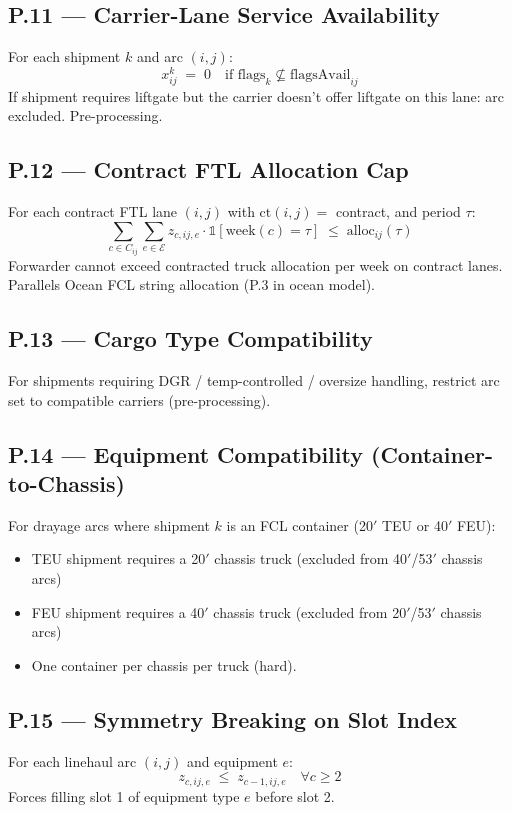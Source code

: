 \documentclass[11pt,a4paper]{article}
\theoremstyle{definition}
\begin{document}
\subsection*{P.11 — Carrier-Lane Service Availability}
For each shipment $k$ and arc $(i,j)$:
\begin{equation}
  x_{ij}^k \;=\; 0 \quad \text{if } \text{flags}_k \not\subseteq \text{flagsAvail}_{ij}
  \label{eq:tk-P11}
\end{equation}
If shipment requires liftgate but the carrier doesn't offer liftgate on this lane: arc
excluded. Pre-processing.

\subsection*{P.12 — Contract FTL Allocation Cap}
For each contract FTL lane $(i,j)$ with $\text{ct}(i,j) = $ contract, and period $\tau$:
\begin{equation}
  \sum_{c \in C_{ij}} \sum_{e \in \mathcal{E}} z_{c,ij,e} \cdot \mathbb{1}[\text{week}(c) = \tau]
  \;\leq\; \text{alloc}_{ij}(\tau)
  \label{eq:tk-P12}
\end{equation}
Forwarder cannot exceed contracted truck allocation per week on contract lanes.
Parallels Ocean FCL string allocation (P.3 in ocean model).

\subsection*{P.13 — Cargo Type Compatibility}
For shipments requiring DGR / temp-controlled / oversize handling, restrict arc set
to compatible carriers (pre-processing).

\subsection*{P.14 — Equipment Compatibility (Container-to-Chassis)}
For drayage arcs where shipment $k$ is an FCL container (20$'$ TEU or 40$'$ FEU):
\begin{itemize}[noitemsep]
  \item TEU shipment requires a 20$'$ chassis truck (excluded from 40$'$/53$'$ chassis arcs)
  \item FEU shipment requires a 40$'$ chassis truck (excluded from 20$'$/53$'$ chassis arcs)
  \item One container per chassis per truck (hard).
\end{itemize}

\subsection*{P.15 — Symmetry Breaking on Slot Index}
\label{sec:symmetry}
For each linehaul arc $(i,j)$ and equipment $e$:
\begin{equation}
  z_{c,ij,e} \;\leq\; z_{c-1,ij,e} \quad \forall c \geq 2
  \label{eq:tk-P15}
\end{equation}
Forces filling slot 1 of equipment type $e$ before slot 2.
\end{document}
